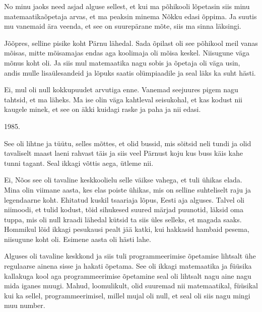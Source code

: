 
No minu jaoks need asjad alguse sellest, et kui ma põhikooli lõpetasin siis 
minu matemaatikaõpetaja arvas, et ma peaksin minema Nõkku edasi õppima. Ja suutis mu vanemaid ära veenda, et see on suurepärane 
mõte, siis ma sinna läksingi.


Jõõpres, selline pisike koht Pärnu 
lähedal. Sada õpilast oli see põhikool meil vanas  mõisas, mitte mõisamajas 
endas aga koolimaja oli mõisa keskel. Niisugune väga mõnus koht oli. Ja siis 
mul matemaatika nagu sobis ja õpetaja oli väga usin, andis mulle lisaülesandeid 
ja lõpuks saatis olümpiaadile ja seal läks ka suht hästi.



Ei, mul oli null kokkupuudet arvutiga enne. Vanemad seejuures pigem nagu 
tahtsid, et ma läheks. Ma ise olin väga  kahtleval seisukohal, et kas kodust 
nii kaugele minek, et see on äkki kuidagi raske ja paha ja nii edasi. 


1985. 


See oli lihtne ja tüütu, selles mõttes, et olid bussid, mis sõitsid neli tundi 
ja olid tavaliselt maast laeni rahvast täis ja siis veel Pärnust koju kus buss 
käis kahe tunni tagant. Seal ikkagi võttis aega, ütleme nii.  


Ei, Nõos see oli tavaline keskkoolielu selle väikse vahega, et tuli ühikas 
elada. Mina olin viimane aasta, kes elas poiste ühikas, mis on selline 
suhteliselt raju ja legendaarne koht. Ehitatud kuskil tsaariaja lõpus, Eesti 
aja alguses. Talvel oli niimoodi, et tulid  kodust, tõid sihukesed suured 
märjad puunotid, läksid oma tuppa, mis oli  null kraadi lähedal kütsid ta siis 
üles selleks, et magada saaks. Hommikul lõid ikkagi pesukausi pealt jää katki, 
kui hakkasid hambaid pesema, niisugune koht oli. Esimene aasta oli hästi lahe. 

Alguses oli tavaline keskkond ja siis tuli programmeerimise õpetamise lihtsalt 
ühe regulaarse ainena sisse ja hakati õpetama. See oli ikkagi matemaatika ja 
füüsika kallakuga kool aga programmeerimise õpetamine seal oli lihtsalt nagu 
aine nagu mida iganes muugi. Mahud, loomulikult, olid suuremad nii 
matemaatikal, füüsikal kui ka sellel, programmeerimisel, millel mujal oli null, 
et seal oli siis nagu mingi muu number.

